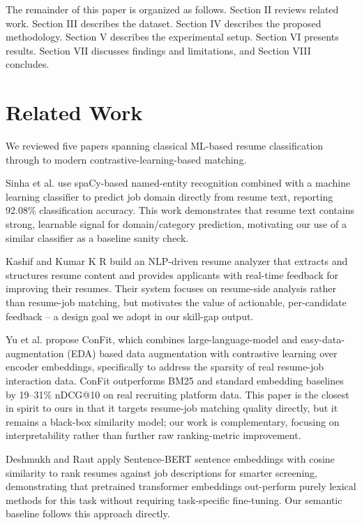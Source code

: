 \documentclass[conference]{IEEEtran}
\begin{document}
The remainder of this paper is organized as follows. Section II reviews related work. Section III describes the dataset. Section IV describes the proposed methodology. Section V describes the experimental setup. Section VI presents results. Section VII discusses findings and limitations, and Section VIII concludes.

\section{Related Work}

We reviewed five papers spanning classical ML-based resume classification through to modern contrastive-learning-based matching.

Sinha et al. \cite{sinha2023} use spaCy-based named-entity recognition combined with a machine learning classifier to predict job domain directly from resume text, reporting 92.08\% classification accuracy. This work demonstrates that resume text contains strong, learnable signal for domain/category prediction, motivating our use of a similar classifier as a baseline sanity check.

Kashif and Kumar K R \cite{kashif2024} build an NLP-driven resume analyzer that extracts and structures resume content and provides applicants with real-time feedback for improving their resumes. Their system focuses on resume-side analysis rather than resume-job matching, but motivates the value of actionable, per-candidate feedback -- a design goal we adopt in our skill-gap output.

Yu et al. \cite{yu2024confit} propose ConFit, which combines large-language-model and easy-data-augmentation (EDA) based data augmentation with contrastive learning over encoder embeddings, specifically to address the sparsity of real resume-job interaction data. ConFit outperforms BM25 and standard embedding baselines by 19--31\% nDCG@10 on real recruiting platform data. This paper is the closest in spirit to ours in that it targets resume-job matching quality directly, but it remains a black-box similarity model; our work is complementary, focusing on interpretability rather than further raw ranking-metric improvement.

Deshmukh and Raut \cite{deshmukh2024} apply Sentence-BERT sentence embeddings with cosine similarity to rank resumes against job descriptions for smarter screening, demonstrating that pretrained transformer embeddings out-perform purely lexical methods for this task without requiring task-specific fine-tuning. Our semantic baseline follows this approach directly.
\end{document}
